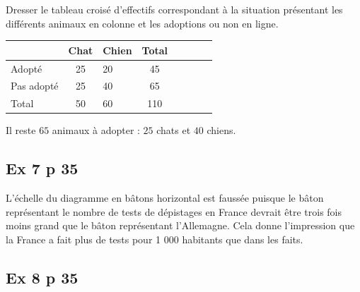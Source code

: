 \documentclass[12pt,a4paper]{book}
\begin{document}
\begin{enumMet}[label=\arabic*.]
	\item Dresser le tableau croisé d'effectifs correspondant à la situation présentant les différents animaux en colonne et les adoptions ou non en ligne.
	
	\begin{center}
		\begin{tabular}{ | Xc | Xc | Xc | Xc | }
			\hline
			
			
			& 
			
			Chat & 
			
			Chien & 
			
			Total\\ \hline
			
			
			Adopté & 
			
			25 & 
			
			20 & 
			
			45\\ \hline
			
			
			Pas adopté & 
			
			25 & 
			
			40 & 
			
			65\\ \hline
			
			
			Total & 
			
			50 & 
			
			60 & 
			
			110\\ \hline
		\end{tabular}
	\end{center}
	\item Il reste $65$ animaux à adopter : $25$ chats et $40$ chiens.
\end{enumMet}

\subsection*{Ex 7 p 35}

L'échelle du diagramme en bâtons horizontal est faussée puisque le bâton représentant le nombre de tests de dépistages en France devrait être trois fois moins grand que le bâton représentant l'Allemagne. Cela donne l'impression que la France a fait plus de tests pour 1 000 habitants que dans les faits.

\subsection*{Ex 8 p 35}
\end{document}
